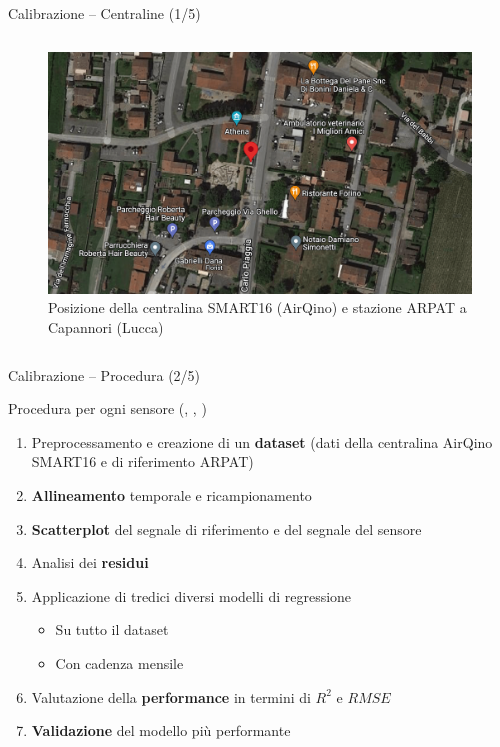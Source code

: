 \begin{frame}{Calibrazione – Centraline (1/5)}
\begin{columns}
\begin{column}{0.46\textwidth}
\begin{center}
\vspace{-.2cm}
\begin{figure}[H]
\centering
\captionsetup{justification=centering}
\includegraphics[width=.9\textwidth]{images/capannori_gps_r}
\caption{Posizione della centralina SMART16 (AirQino) e stazione ARPAT a Capannori (Lucca)}
\end{figure}
\end{center}
\end{column}
\end{columns}
\let\oldfootnotesize\footnotesize
\renewcommand*{\footnotesize}{\oldfootnotesize\tiny}
\addtocounter{footnote}{0}
\end{frame}

\begin{frame}{Calibrazione – Procedura (2/5)}
\begin{block}{Procedura per ogni sensore (, , )}
\begin{enumerate}
  \item Preprocessamento e creazione di un \textbf{dataset} (dati della centralina AirQino SMART16 e di riferimento ARPAT)
  \item \textbf{Allineamento} temporale e ricampionamento
  \item \textbf{Scatterplot} del segnale di riferimento e del segnale del sensore
  \item Analisi dei \textbf{residui}
  \item Applicazione di tredici diversi modelli di \alert{regressione}
  \begin{itemize}
    \item Su tutto il dataset
    \item Con cadenza mensile
  \end{itemize}
  \item Valutazione della \textbf{performance} in termini di $R^2$ e $RMSE$
  \item \textbf{Validazione} del modello più performante\vspace{0.1cm}
\end{enumerate}
\end{block}

\end{frame}

